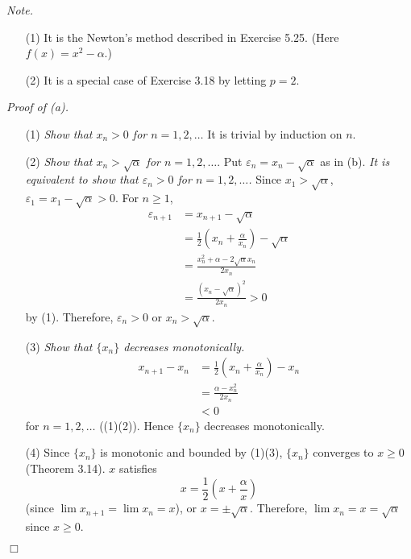 \documentclass{article}
\begin{document}
\emph{Note.}
\begin{enumerate}
  \item[(1)]
  It is the Newton's method described in Exercise 5.25.
  (Here $f(x) = x^2 - \alpha$.)
  \item[(2)]
  It is a special case of Exercise 3.18 by letting $p = 2$. \\
\end{enumerate}

\emph{Proof of (a).}
\begin{enumerate}
  \item[(1)]
  \emph{Show that $x_n > 0$ for $n=1,2,\ldots$}
  It is trivial by induction on $n$.
  \item[(2)]
  \emph{Show that $x_n > \sqrt{\alpha}$ for $n=1,2,\ldots$}.
  Put $\varepsilon_n = x_n - \sqrt{\alpha}$ as in (b).
  \emph{It is equivalent to show that $\varepsilon_n > 0$ for $n=1,2,\ldots$.}
  Since $x_1 > \sqrt{\alpha}$,
  $\varepsilon_1 = x_1 - \sqrt{\alpha} > 0$. For $n \geq 1$,
  \begin{align*}
    \varepsilon_{n+1}
    &= x_{n+1} - \sqrt{\alpha} \\
    &= \frac{1}{2}\left( x_n + \frac{\alpha}{x_n} \right) - \sqrt{\alpha} \\
    &= \frac{x_n^2 + \alpha - 2\sqrt{\alpha}x_n}{2 x_n} \\
    &= \frac{(x_n - \sqrt{\alpha})^2}{2 x_n} > 0
  \end{align*}
  by (1).
  Therefore, $\varepsilon_n > 0$ or $x_n > \sqrt{\alpha}$.
  \item[(3)]
  \emph{Show that $\{x_n\}$ decreases monotonically.}
  \begin{align*}
    x_{n+1} - x_n
    &= \frac{1}{2}\left( x_n + \frac{\alpha}{x_n} \right) - x_n \\
    &= \frac{\alpha - x_n^2}{2x_n} \\
    &< 0
  \end{align*}
  for $n = 1,2,\ldots$ ((1)(2)).
  Hence $\{x_n\}$ decreases monotonically.
  \item[(4)]
  Since $\{x_n\}$ is monotonic and bounded by (1)(3),
  $\{x_n\}$ converges to $x \geq 0$ (Theorem 3.14).
  $x$ satisfies $$x = \frac{1}{2}\left( x + \frac{\alpha}{x} \right)$$
  (since $\lim x_{n+1} = \lim x_n = x$),
  or $x = \pm \sqrt{\alpha}$.
  Therefore, $\lim x_n = x = \sqrt{\alpha}$ since $x \geq 0$.
\end{enumerate}
$\Box$ \\
\end{document}
